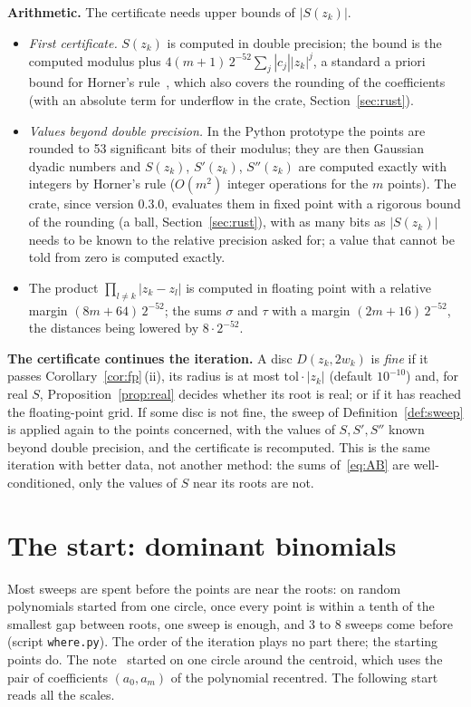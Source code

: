 \documentclass[10pt,a4paper]{article}
\theoremstyle{definition}
\numberwithin{equation}{section}
\begin{document}
\textbf{Arithmetic.} The certificate needs upper bounds of $|S(z_k)|$.
\begin{itemize}
\item \emph{First certificate.} $S(z_k)$ is computed in double precision; the bound is the computed
 modulus plus $4(m+1)\,2^{-52}\sum_j|c_j||z_k|^j$, a standard a priori bound for Horner's
 rule~\cite{higham}, which also covers the rounding of the coefficients (with an absolute term for
 underflow in the crate, Section~\ref{sec:rust}).
\item \emph{Values beyond double precision.} In the Python prototype the points are rounded to 53
 significant bits of their modulus; they are then Gaussian dyadic numbers and $S(z_k)$, $S'(z_k)$,
 $S''(z_k)$ are computed exactly with integers by Horner's rule ($O(m^2)$ integer operations for the
 $m$ points). The crate, since version 0.3.0, evaluates them in fixed point with a rigorous bound of
 the rounding (a ball, Section~\ref{sec:rust}), with as many bits as $|S(z_k)|$ needs to be known to
 the relative precision asked for; a value that cannot be told from zero is computed exactly.
\item The product $\prod_{l\ne k}|z_k-z_l|$ is computed in floating point with a relative margin
 $(8m+64)\,2^{-52}$; the sums $\sigma$ and $\tau$ with a margin $(2m+16)\,2^{-52}$, the distances
 being lowered by $8\cdot2^{-52}$.
\end{itemize}
\textbf{The certificate continues the iteration.} A disc $D(z_k,2w_k)$ is \emph{fine} if it passes
Corollary~\ref{cor:fp}\,(ii), its radius is at most $\mathrm{tol}\cdot|z_k|$ (default $10^{-10}$)
and, for real $S$, Proposition~\ref{prop:real} decides whether its root is real; or if it has
reached the floating-point grid. If some disc is not fine, the sweep of Definition~\ref{def:sweep} is
applied again to the points concerned, with the values of $S,S',S''$ known beyond double precision,
and the certificate is recomputed. This is the same iteration with better data, not another method:
the sums of~\eqref{eq:AB} are well-conditioned, only the values of $S$ near its roots are not.

\section{The start: dominant binomials}\label{sec:start}
Most sweeps are spent before the points are near the roots: on random polynomials started from one
circle, once every point is within a tenth of the smallest gap between roots, one sweep is enough,
and 3 to 8 sweeps come before (script \texttt{where.py}). The order of the iteration plays no part
there; the starting points do. The note~\cite{g7} started on one circle around the centroid, which
uses the pair of coefficients $(a_0,a_m)$ of the polynomial recentred. The following start reads all
the scales.
\end{document}
